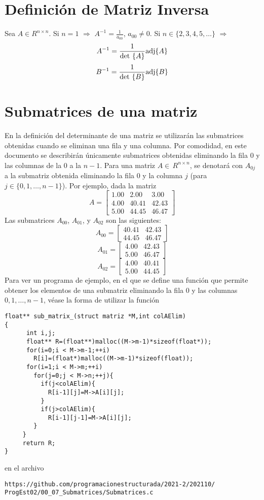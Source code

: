 \documentclass{article}
\def\InvDA{
$A^{-1}=\frac{1}{\mbox{\rm det\ }\{A\}}\mbox{\rm adj}\{A\}$
}
\def\InvD#1{
#1^{-1}=\frac{1}{\mbox{\rm det\ }\{#1\}}\mbox{\rm adj}\{#1\}
}
\begin{document}
\section{Def\/inici\'on de Matriz Inversa}
Sea $A\in R^{n\times n}$. Si $n=1$ $\Rightarrow$ 
$A^{-1}=\frac{1}{a_{00}}$, $a_{00}\neq 0$. Si $n\in\{2,3,4,5,\ldots\}$
$\Rightarrow$ 
\[
A^{-1}=\frac{1}
{\mbox{\rm det\ }\{A\}}\mbox{\rm adj}\{A\}
\]
\[
\InvD{B}
\]
\section{Submatrices de una matriz}
En la definici\'{o}n del determinante de una matriz se utilizar\'{a}n las submatrices 
obtenidas cuando se eliminan una fila y una columna. Por comodidad, en este documento 
se describir\'{a}n \'{u}nicamente submatrices obtenidas eliminando la fila 0 y las 
columnas de la 0 a la $n-1$. Para una matriz $A\in\,R^{n\times n}$, se denotar\'{a} con 
$A_{0j}$ a la submatriz obtenida eliminando la  fila 0 y la columna  $j$ (para 
$j\in\{0,1,\ldots,n-1\}$). Por ejemplo, dada la matriz
\[
A = \left[\begin{array}{ccc}
1.00&2.00&3.00\\
4.00&40.41&42.43\\
5.00&44.45&46.47
\end{array}\right]
\]
Las submatrices $A_{00}$, $A_{01}$, y $A_{02}$ son las siguientes:
\[
A_{00} =  
\left[\begin{array}{cc}
40.41&42.43\\
44.45&46.47
\end{array}\right]
\]
\[
A_{01} =  
\left[\begin{array}{cc}
4.00&42.43\\
5.00&46.47
\end{array}\right]
\]
\[
A_{02} =  
\left[\begin{array}{cc}
4.00&40.41\\
5.00&44.45
\end{array}\right]
\]
Para ver un programa de ejemplo, en el que se def\/ine una funci\'{o}n que permite 
obtener los  elementos de una submatriz eliminando la fila 0 y las columnas 
$0,1,\ldots,n-1$, v\'{e}ase la forma de utilizar la funci\'{o}n 
\begin{verbatim} 
float** sub_matrix_(struct matriz *M,int colAElim)
{
      int i,j;
      float** R=(float**)malloc((M->m-1)*sizeof(float*));
      for(i=0;i < M->m-1;++i)
        R[i]=(float*)malloc((M->m-1)*sizeof(float));
      for(i=1;i < M->m;++i)
        for(j=0;j < M->n;++j){
          if(j<colAElim){
            R[i-1][j]=M->A[i][j];
          }
          if(j>colAElim){
            R[i-1][j-1]=M->A[i][j];
        }
     }
     return R;
}
\end{verbatim}
en el archivo 
\begin{verbatim}
https://github.com/programacionestructurada/2021-2/202110/
ProgEst02/00_07_Submatrices/Submatrices.c
\end{verbatim}
\end{document}
